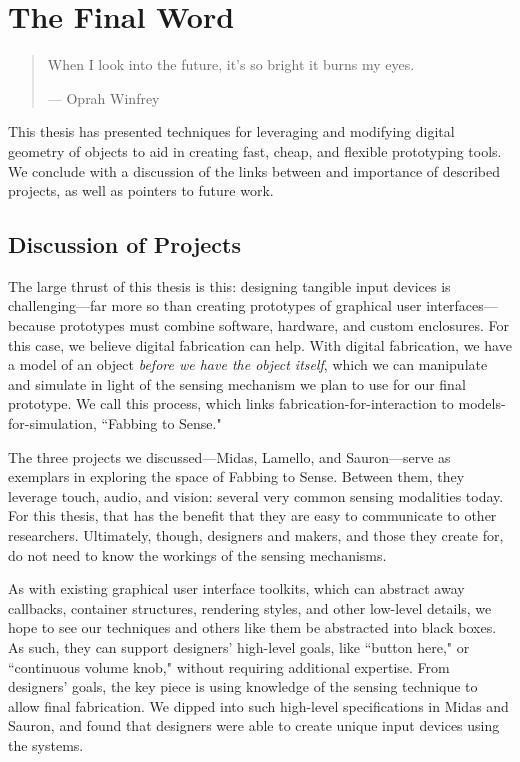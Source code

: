 \chapter{The Final Word}

\begin{quote}
When I look into the future, it's so bright it burns my eyes.

--- Oprah Winfrey
\end{quote}

This thesis has presented techniques for leveraging and modifying digital geometry of objects to aid in creating fast, cheap, and flexible prototyping tools. We conclude with a discussion of the links between and importance of described projects, as well as pointers to future work.

\section{Discussion of Projects}

The large thrust of this thesis is this: designing tangible input devices is challenging---far more so than creating prototypes of graphical user interfaces---because prototypes must combine software, hardware, and custom enclosures. For this case, we believe digital fabrication can help. With digital fabrication, we have a model of an object \emph{before we have the object itself}, which we can manipulate and simulate in light of the sensing mechanism we plan to use for our final prototype. We call this process, which links fabrication-for-interaction to models-for-simulation, ``Fabbing to Sense."

The three projects we discussed---Midas, Lamello, and Sauron---serve as exemplars in exploring the space of Fabbing to Sense. Between them, they leverage touch, audio, and vision: several very common sensing modalities today. For this thesis, that has the benefit that they are easy to communicate to other researchers. Ultimately, though, designers and makers, and those they create for, do not need to know the workings of the sensing mechanisms.

As with existing graphical user interface toolkits, which can abstract away callbacks, container structures, rendering styles, and other low-level details, we hope to see our techniques and others like them be abstracted into black boxes. As such, they can support designers' high-level goals, like ``button here," or ``continuous volume knob," without requiring additional expertise. From designers' goals, the key piece is using knowledge of the sensing technique to allow final fabrication. We dipped into such high-level specifications in Midas and Sauron, and found that designers were able to create unique input devices using the systems.

